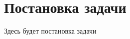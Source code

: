 \renewcommand{\chaptertitle}{Постановка задачи}  %
\chapter{\chaptertitle}\label{ch:ch4}

Здесь будет постановка задачи